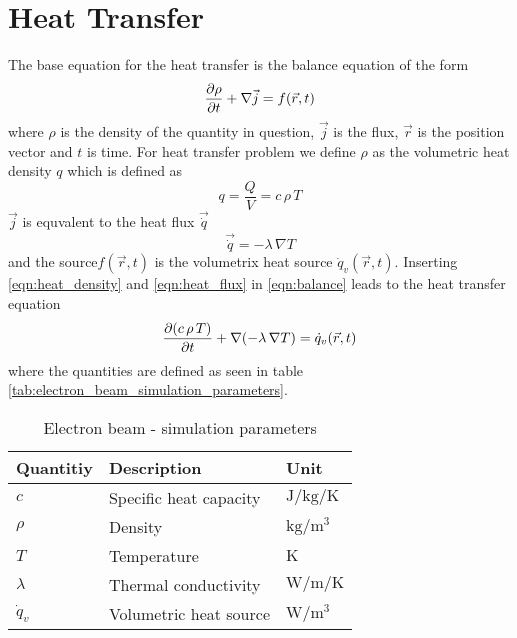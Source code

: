 \chapter{Heat Transfer}
The base equation for the heat transfer is the balance equation of the form
\begin{equation}
\label{eqn:balance}
    \pdv{\rho}{t} + \nabla \vec{j} = f(\vec{r}, t)
\end{equation}
where $\rho$ is the density of the quantity in question, $\vec{j}$ is the flux, $\vec{r}$ is the position vector and $t$ is time.
For heat transfer problem we define $\rho$ as the volumetric heat density $q$ which is defined as
\begin{equation}
\label{eqn:heat_density}
    q = \frac{Q}{V} = c \, \rho \, T
\end{equation}
$\vec{j}$ is equvalent to the heat flux $\vec{\dot{q}}$
\begin{equation}
\label{eqn:heat_flux}
    \vec{\dot{q}} = -\lambda \, \nabla T
\end{equation}
and the source$f(\vec{r}, t)$ is the volumetrix heat source $\dot{q}_v(\vec{r}, t)$.
Inserting \ref{eqn:heat_density} and \ref{eqn:heat_flux} in \ref{eqn:balance} leads to the heat transfer equation
\begin{equation}
\label{eqn:heat_transfer}
    \pdv{(c \, \rho \, T)}{t} + \nabla (-\lambda \, \nabla T ) = \dot{q}_v(\vec{r}, t)
\end{equation}
where the quantities are defined as seen in table \ref{tab:electron_beam_simulation_parameters}.
\begin{table}[ht]
\centering
\caption{Electron beam - simulation parameters}
\label{tab:parameters}
\begin{tabular}{lll}
\hline
\hline
Quantitiy & Description & Unit\\
\hline
$c$ & Specific heat capacity & $\si{\joule\per\kilogram\per\kelvin}$\\
$\rho$ & Density & $\si{\kilogram\per\meter\cubed}$\\
$T$ & Temperature & $\si{\kelvin}$\\
$\lambda$ & Thermal conductivity & $\si{\watt\per\meter\per\kelvin}$\\
$\dot{q}_v$ & Volumetric heat source & $\si{\watt\per\meter\cubed}$\\
\hline
\hline
\end{tabular}
\end{table}

